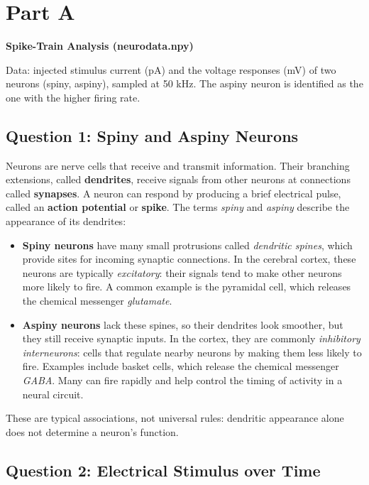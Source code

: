 \section{Part A}

\noindent\textbf{Spike-Train Analysis (neurodata.npy)}

Data: injected stimulus current (pA) and the voltage responses (mV) of two neurons (spiny, aspiny), sampled at 50 kHz. The aspiny neuron is identified as the one with the higher firing rate.

\FloatBarrier
\subsection{Question 1: Spiny and Aspiny Neurons}

Neurons are nerve cells that receive and transmit information. Their branching extensions, called \textbf{dendrites}, receive signals from other neurons at connections called \textbf{synapses}. A neuron can respond by producing a brief electrical pulse, called an \textbf{action potential} or \textbf{spike}. The terms \emph{spiny} and \emph{aspiny} describe the appearance of its dendrites:

\begin{itemize}
    \item \textbf{Spiny neurons} have many small protrusions called \emph{dendritic spines}, which provide sites for incoming synaptic connections. In the cerebral cortex, these neurons are typically \emph{excitatory}: their signals tend to make other neurons more likely to fire. A common example is the pyramidal cell, which releases the chemical messenger \emph{glutamate}.
    \item \textbf{Aspiny neurons} lack these spines, so their dendrites look smoother, but they still receive synaptic inputs. In the cortex, they are commonly \emph{inhibitory interneurons}: cells that regulate nearby neurons by making them less likely to fire. Examples include basket cells, which release the chemical messenger \emph{GABA}. Many can fire rapidly and help control the timing of activity in a neural circuit.
\end{itemize}

These are typical associations, not universal rules: dendritic appearance alone does not determine a neuron's function.

\FloatBarrier
\subsection{Question 2: Electrical Stimulus over Time}

